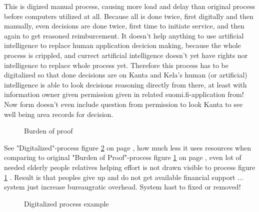 This is digized manual process,
causing more load and delay than original process before computers utilized at all.
Because all is done twice, first digitally and then manually, even decisions are done twice,
first time to initiate service, and then again to get reasoned reimburcement.
It doesn't help anything to use artificial intelligence\cite{PerukirjaTukiehdotuksetTekoaly}
to replace human application decicion making, because the whole process is crippled,
and currect artificial intelligence doesn't yet have rights nor intelligence to replace whole process yet.
Therefore this process has to be digitalized so that done decisions are on Kanta
and Kela's human (or artificial) intelligence is able to look decisions reasoning directly from there,
at least with information owner given permission given in related suomi.fi-application from!
Now form doesn't even include question from permission to look Kanta to see
well being area records for decision\cite{LifeEventDetailDrivenProcessQuides}.

\begin{figure}
 \begin{center}
  \caption{Burden of proof}
  \label{fig:burdofpr}
 \end{center}
\end{figure}

See "Digitalized"-process figure \ref{fig:digitalized} on page
\pageref{fig:digitalized}, how much less it uses resources when comparing
to original "Burden of Proof"-process figure \ref{fig:burdofpr} on page
\pageref{fig:burdofpr}, even lot of needed elderly people relatives
helping effort is not drawn visible to process
figure \ref{fig:burdofpr} \cite{VMAuroraAiNakokulmiaIhmiskeskeisyyteen}.
Result is that peoples give up and do not get available financial support
\cite{ElakelaisetRynJanKoskimiesJaElakeliitonIreneVuorisalo}\-\cite{ElakelaisetEivatTieda}\-\cite{StudentHousingAllowance}\-\cite{Many_Stepwise_Rules_Leads_To_Mess}...
system just increase bureaugratic overhead.
System hast to fixed or removed!

\begin{figure}
 \begin{center}
  \caption{Digitalized process example}
  \label{fig:digitalized} 
 \end{center}
\end{figure}


